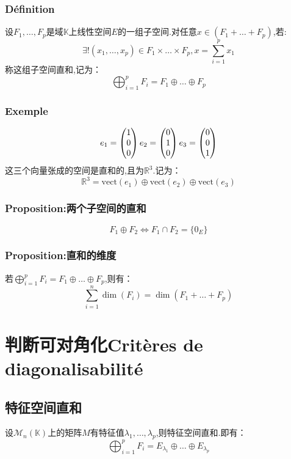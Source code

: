 \documentclass[12pt, a4paper, oneside]{ctexbook}
\newcommand{\R }{\mathbb{R}}%
\begin{document}
  \subsubsection{Définition}
  设$F_1,\dots,F_p$是域$\mathbb{K}$上线性空间$E$的一组子空间.对任意$x\in(F_1+\dots+F_p)$,若:
  $$
    \exists!(x_1,\dots,x_p)\in F_1\times\dots\times F_p,  
    x=\sum_{i=1}^{p}x_1
  $$
  称这组子空间直和,记为：
  $$
    \bigoplus _{i=1}^pF_i=F_1\oplus\dots\oplus F_p
  $$
  \subsubsection{Exemple}
  \begin{equation}
    \notag
    e_1=\begin{pmatrix} 1 \\ 0 \\ 0 \end{pmatrix}
    e_2=\begin{pmatrix} 0 \\ 1 \\ 0 \end{pmatrix}
    e_3=\begin{pmatrix} 0 \\ 0 \\ 1 \end{pmatrix}
  \end{equation}
  这三个向量张成的空间是直和的,且为$\R^3$.记为：
  $$
  \R^3=\mbox{vect}(e_1)\oplus\mbox{vect}(e_2)\oplus\mbox{vect}(e_3)
  $$
  \subsubsection{Proposition:两个子空间的直和}
  $$
  F_1\oplus F_2 \Leftrightarrow F_1\cap F_2=\{0_E\}
  $$
  \subsubsection{Proposition:直和的维度}
  若$\bigoplus _{i=1}^pF_i=F_1\oplus\dots\oplus F_p$,则有：
  $$
  \sum_{i=1}^{n}\dim(F_i)=\dim(F_1+\dots+F_p)
  $$
  \section{判断可对角化Critères de diagonalisabilité}
  \subsection{特征空间直和}
  设$\mathcal{M}_n(\mathbb{K})$上的矩阵$M$有特征值$\lambda_1,\dots,\lambda_p$,则特征空间直和.即有：
  $$
  \bigoplus _{i=1}^pF_i=E_{\lambda_1}\oplus\dots\oplus E_{\lambda_p}
  $$
\end{document}
